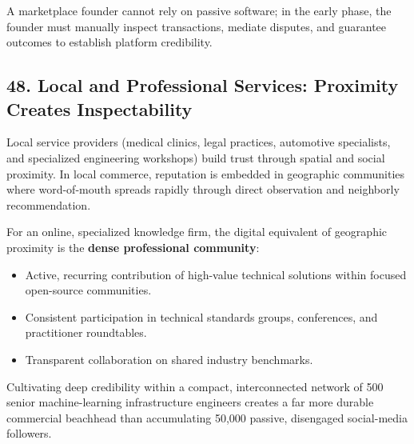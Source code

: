 A marketplace founder cannot rely on passive software; in the early phase, the founder must manually inspect transactions, mediate disputes, and guarantee outcomes to establish platform credibility.

\subsection*{48. Local and Professional Services: Proximity Creates Inspectability}

Local service providers (medical clinics, legal practices, automotive specialists, and specialized engineering workshops) build trust through spatial and social proximity. In local commerce, reputation is embedded in geographic communities where word-of-mouth spreads rapidly through direct observation and neighborly recommendation.

For an online, specialized knowledge firm, the digital equivalent of geographic proximity is the \textbf{dense professional community}:
\begin{itemize}
\item Active, recurring contribution of high-value technical solutions within focused open-source communities.
\item Consistent participation in technical standards groups, conferences, and practitioner roundtables.
\item Transparent collaboration on shared industry benchmarks.
\end{itemize}

Cultivating deep credibility within a compact, interconnected network of 500 senior machine-learning infrastructure engineers creates a far more durable commercial beachhead than accumulating 50,000 passive, disengaged social-media followers.
